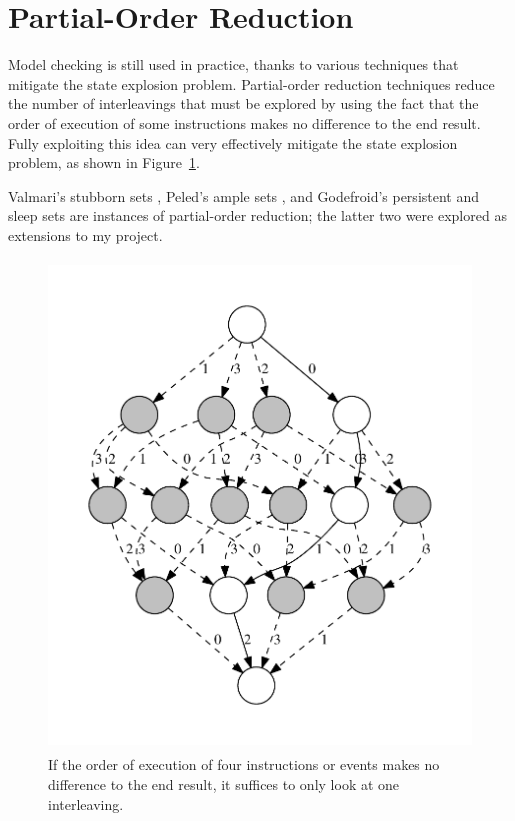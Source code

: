 \documentclass[12pt,a4paper,twoside,openright]{report}
\begin{document}
\section{Partial-Order Reduction}

Model checking is still used in practice, thanks
to various techniques that mitigate
the state explosion problem. Partial-order reduction
techniques reduce the number
of interleavings that must be explored
by using the fact that the order
of execution of some instructions makes
no difference to the end result.
Fully exploiting
this idea can very effectively mitigate the
state explosion problem, as shown in
Figure~\ref{fig:por}.

Valmari's stubborn sets \cite{val90},
Peled's ample sets \cite{pel94},
and Godefroid's persistent and sleep sets
\cite{god91} are
instances of partial-order reduction; the
latter two were explored as extensions to
my project.

\begin{figure}[t]
	\centering
	\includegraphics*[height=13cm]{por}
	\caption[Illustration of partial-order reduction.]
	{If the order of execution of four instructions or
		events makes no difference to the end result, it
		suffices to only look at one interleaving.}
	\label{fig:por}
\end{figure}
\end{document}
